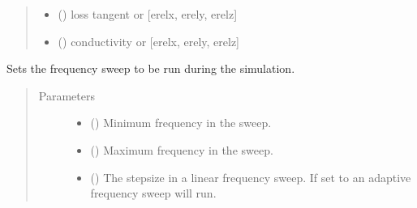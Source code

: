 \documentclass[letterpaper,10pt,english,openany]{sphinxmanual}
\begin{document}
\begin{fulllineitems}
\begin{fulllineitems}
\begin{quote}
\begin{description}
\begin{itemize}
\item {} 
 () \textendash{} loss tangent or {[}erelx, erely, erelz{]}

\item {} 
 () \textendash{} conductivity or {[}erelx, erely, erelz{]}

\end{itemize}

\end{description}\end{quote}

\end{fulllineitems}


\begin{fulllineitems}
\label{\detokenize{source/sonpy:sonpy.sonnet.setFrequencySweep}}
Sets the frequency sweep to be run during the simulation.
\begin{quote}\begin{description}
\item[{Parameters}] \leavevmode\begin{itemize}
\item {} 
 () \textendash{} Minimum frequency in the sweep.

\item {} 
 () \textendash{} Maximum frequency in the sweep.

\item {} 
 () \textendash{} The stepsize in a linear frequency sweep. If set to  an adaptive frequency sweep will run.


\end{itemize}
\end{description}
\end{quote}
\end{fulllineitems}
\end{fulllineitems}
\end{document}
